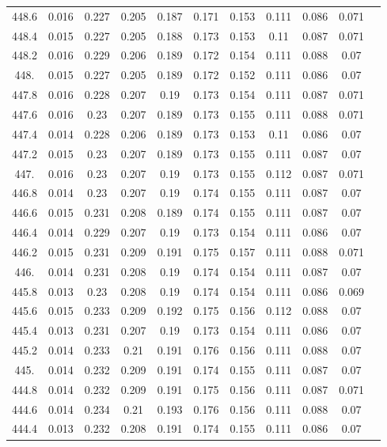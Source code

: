 \documentclass[12pt]{ctexart}
\numberwithin{equation}{section}
\begin{document}
\begin{longtable}{ccccccccccc}
448.6	&	0.016	&	0.227	&	0.205	&	0.187	&	0.171	&	0.153	&	0.111	&	0.086	&	0.071	\\
448.4	&	0.015	&	0.227	&	0.205	&	0.188	&	0.173	&	0.153	&	0.11	&	0.087	&	0.071	\\
448.2	&	0.016	&	0.229	&	0.206	&	0.189	&	0.172	&	0.154	&	0.111	&	0.088	&	0.07	\\
448.	&	0.015	&	0.227	&	0.205	&	0.189	&	0.172	&	0.152	&	0.111	&	0.086	&	0.07	\\
447.8	&	0.016	&	0.228	&	0.207	&	0.19	&	0.173	&	0.154	&	0.111	&	0.087	&	0.071	\\
447.6	&	0.016	&	0.23	&	0.207	&	0.189	&	0.173	&	0.155	&	0.111	&	0.088	&	0.071	\\
447.4	&	0.014	&	0.228	&	0.206	&	0.189	&	0.173	&	0.153	&	0.11	&	0.086	&	0.07	\\
447.2	&	0.015	&	0.23	&	0.207	&	0.189	&	0.173	&	0.155	&	0.111	&	0.087	&	0.07	\\
447.	&	0.016	&	0.23	&	0.207	&	0.19	&	0.173	&	0.155	&	0.112	&	0.087	&	0.071	\\
446.8	&	0.014	&	0.23	&	0.207	&	0.19	&	0.174	&	0.155	&	0.111	&	0.087	&	0.07	\\
446.6	&	0.015	&	0.231	&	0.208	&	0.189	&	0.174	&	0.155	&	0.111	&	0.087	&	0.07	\\
446.4	&	0.014	&	0.229	&	0.207	&	0.19	&	0.173	&	0.154	&	0.111	&	0.086	&	0.07	\\
446.2	&	0.015	&	0.231	&	0.209	&	0.191	&	0.175	&	0.157	&	0.111	&	0.088	&	0.071	\\
446.	&	0.014	&	0.231	&	0.208	&	0.19	&	0.174	&	0.154	&	0.111	&	0.087	&	0.07	\\
445.8	&	0.013	&	0.23	&	0.208	&	0.19	&	0.174	&	0.154	&	0.111	&	0.086	&	0.069	\\
445.6	&	0.015	&	0.233	&	0.209	&	0.192	&	0.175	&	0.156	&	0.112	&	0.088	&	0.07	\\
445.4	&	0.013	&	0.231	&	0.207	&	0.19	&	0.173	&	0.154	&	0.111	&	0.086	&	0.07	\\
445.2	&	0.014	&	0.233	&	0.21	&	0.191	&	0.176	&	0.156	&	0.111	&	0.088	&	0.07	\\
445.	&	0.014	&	0.232	&	0.209	&	0.191	&	0.174	&	0.155	&	0.111	&	0.087	&	0.07	\\
444.8	&	0.014	&	0.232	&	0.209	&	0.191	&	0.175	&	0.156	&	0.111	&	0.087	&	0.071	\\
444.6	&	0.014	&	0.234	&	0.21	&	0.193	&	0.176	&	0.156	&	0.111	&	0.088	&	0.07	\\
444.4	&	0.013	&	0.232	&	0.208	&	0.191	&	0.174	&	0.155	&	0.111	&	0.086	&	0.07	\\

\end{longtable}
\end{document}
